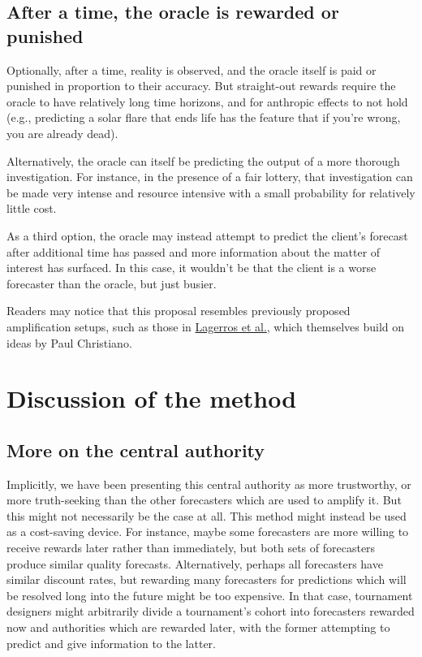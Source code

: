 \documentclass[]{article}
\begin{document}
\hypertarget{after-a-time-the-oracle-is-rewarded-or-punished}{%
\subsection{After a time, the oracle is rewarded or
punished}\label{after-a-time-the-oracle-is-rewarded-or-punished}}

Optionally, after a time, reality is observed, and the oracle itself is
paid or punished in proportion to their accuracy. But straight-out
rewards require the oracle to have relatively long time horizons, and
for anthropic effects to not hold (e.g., predicting a solar flare that
ends life has the feature that if you're wrong, you are already dead).

Alternatively, the oracle can itself be predicting the output of a more
thorough investigation. For instance, in the presence of a fair lottery,
that investigation can be made very intense and resource intensive with
a small probability for relatively little cost.

As a third option, the oracle may instead attempt to predict the
client's forecast after additional time has passed and more information
about the matter of interest has surfaced. In this case, it wouldn't be
that the client is a worse forecaster than the oracle, but just busier.

Readers may notice that this proposal resembles previously proposed
amplification setups, such as those in
\href{https://www.lesswrong.com/posts/cLtdcxu9E4noRSons}{Lagerros et
al.}, which themselves build on ideas by Paul Christiano.

\hypertarget{discussion-of-the-method}{%
\section{Discussion of the method}\label{discussion-of-the-method}}

\hypertarget{more-on-the-central-authority}{%
\subsection{More on the central
authority}\label{more-on-the-central-authority}}

Implicitly, we have been presenting this central authority as more
trustworthy, or more truth-seeking than the other forecasters which are
used to amplify it. But this might not necessarily be the case at all.
This method might instead be used as a cost-saving device. For instance,
maybe some forecasters are more willing to receive rewards later rather
than immediately, but both sets of forecasters produce similar quality
forecasts. Alternatively, perhaps all forecasters have similar discount
rates, but rewarding many forecasters for predictions which will be
resolved long into the future might be too expensive. In that case,
tournament designers might arbitrarily divide a tournament's cohort into
forecasters rewarded now and authorities which are rewarded later, with
the former attempting to predict and give information to the latter.
\end{document}
